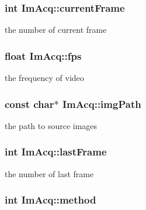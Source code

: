 \hypertarget{structImAcq_a0be9cca3c7dbda6da3ce2752717ce885}{
\subsubsection[{current\-Frame}]{\setlength{\rightskip}{0pt plus 5cm}int Im\-Acq\-::current\-Frame}}\label{structImAcq_a0be9cca3c7dbda6da3ce2752717ce885}


the number of current frame 

\hypertarget{structImAcq_ac17ac96f1bb1ef278a70eeaec6e0275f}{
\subsubsection[{fps}]{\setlength{\rightskip}{0pt plus 5cm}float Im\-Acq\-::fps}}\label{structImAcq_ac17ac96f1bb1ef278a70eeaec6e0275f}


the frequency of video 

\hypertarget{structImAcq_ae389de4997bf71e132171734a7d627eb}{
\subsubsection[{img\-Path}]{\setlength{\rightskip}{0pt plus 5cm}const char$\ast$ Im\-Acq\-::img\-Path}}\label{structImAcq_ae389de4997bf71e132171734a7d627eb}


the path to source images 

\hypertarget{structImAcq_a0afeeee09d54a896433376cf359d209f}{
\subsubsection[{last\-Frame}]{\setlength{\rightskip}{0pt plus 5cm}int Im\-Acq\-::last\-Frame}}\label{structImAcq_a0afeeee09d54a896433376cf359d209f}


the number of last frame 

\hypertarget{structImAcq_a338a470fffa65fbfb9fade98a8fc12ca}{
\subsubsection[{method}]{\setlength{\rightskip}{0pt plus 5cm}int Im\-Acq\-::method}}\label{structImAcq_a338a470fffa65fbfb9fade98a8fc12ca}


